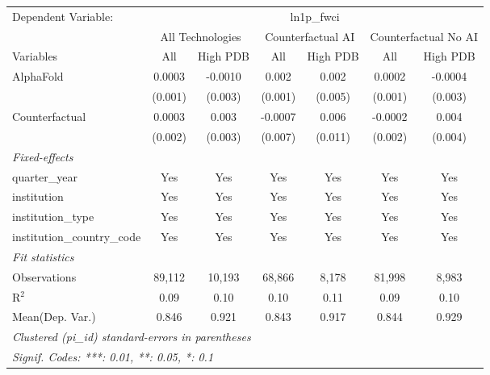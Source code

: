 \begingroup
\centering
\begin{tabular}{lcccccc}
   \tabularnewline \midrule \midrule
   Dependent Variable: & \multicolumn{6}{c}{ln1p\_fwci}\\
 & \multicolumn{2}{c}{All Technologies} & \multicolumn{2}{c}{Counterfactual AI} & \multicolumn{2}{c}{Counterfactual No AI} \\
\cmidrule(lr){1-1}\cmidrule(lr){2-3} \cmidrule(lr){4-5} \cmidrule(lr){6-7}
Variables & \multicolumn{1}{c}{All} & \multicolumn{1}{c}{High PDB} & \multicolumn{1}{c}{All} & \multicolumn{1}{c}{High PDB} & \multicolumn{1}{c}{All} & \multicolumn{1}{c}{High PDB} \\
\cmidrule(lr){1-1}\cmidrule(lr){2-2} \cmidrule(lr){3-3} \cmidrule(lr){4-4} \cmidrule(lr){5-5} \cmidrule(lr){6-6} \cmidrule(lr){7-7}
   AlphaFold                    & 0.0003  & -0.0010 & 0.002   & 0.002   & 0.0002  & -0.0004\\   
                                & (0.001) & (0.003) & (0.001) & (0.005) & (0.001) & (0.003)\\   
   Counterfactual               & 0.0003  & 0.003   & -0.0007 & 0.006   & -0.0002 & 0.004\\   
                                & (0.002) & (0.003) & (0.007) & (0.011) & (0.002) & (0.004)\\   
   \midrule
   \emph{Fixed-effects}\\
   quarter\_year                & Yes     & Yes     & Yes     & Yes     & Yes     & Yes\\  
   institution                  & Yes     & Yes     & Yes     & Yes     & Yes     & Yes\\  
   institution\_type            & Yes     & Yes     & Yes     & Yes     & Yes     & Yes\\  
   institution\_country\_code   & Yes     & Yes     & Yes     & Yes     & Yes     & Yes\\  
   \midrule
   \emph{Fit statistics}\\
   Observations                 & 89,112  & 10,193  & 68,866  & 8,178   & 81,998  & 8,983\\  
   R$^2$                        & 0.09    & 0.10    & 0.10    & 0.11    & 0.09    & 0.10\\  
Mean(Dep. Var.) & 0.846 & 0.921 & 0.843 & 0.917 & 0.844 & 0.929 \\
   \midrule \midrule
   \multicolumn{7}{l}{\emph{Clustered (pi\_id) standard-errors in parentheses}}\\
   \multicolumn{7}{l}{\emph{Signif. Codes: ***: 0.01, **: 0.05, *: 0.1}}\\
\end{tabular}
\par\endgroup
